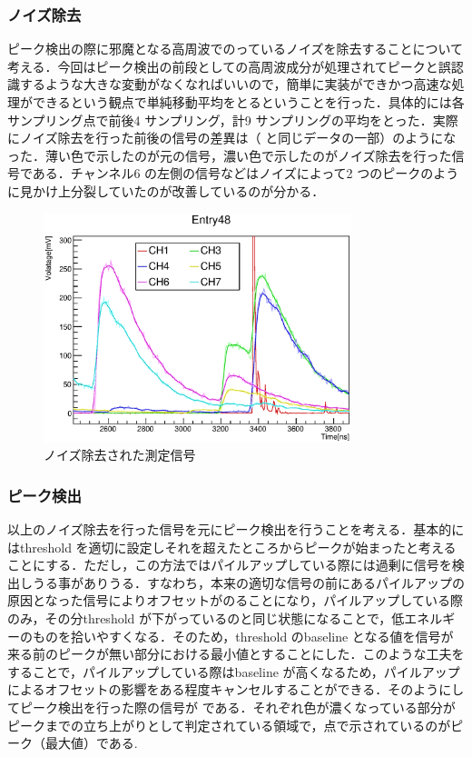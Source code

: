 \subsubsection{ノイズ除去}
ピーク検出の際に邪魔となる高周波でのっているノイズを除去することについて考える．今回はピーク検出の前段としての高周波成分が処理されてピークと誤認識するような大きな変動がなくなればいいので，簡単に実装ができかつ高速な処理ができるという観点で単純移動平均をとるということを行った．具体的には各サンプリング点で前後4 サンプリング，計9 サンプリングの平均をとった．実際にノイズ除去を行った前後の信号の差異は（ と同じデータの一部）のようになった．薄い色で示したのが元の信号，濃い色で示したのがノイズ除去を行った信号である．チャンネル6 の左側の信号などはノイズによって2 つのピークのように見かけ上分裂していたのが改善しているのが分かる．

\begin{figure}[hbt]
\centering
\includegraphics[width=0.8\textwidth]{figure/hatano/smoothdata.eps}
\caption{ノイズ除去された測定信号}
\label{hatano_fig:smoothdata}
\end{figure}

\subsubsection{ピーク検出}
以上のノイズ除去を行った信号を元にピーク検出を行うことを考える．基本的にはthreshold を適切に設定しそれを超えたところからピークが始まったと考えることにする．ただし，この方法ではパイルアップしている際には過剰に信号を検出しうる事がありうる．すなわち，本来の適切な信号の前にあるパイルアップの原因となった信号によりオフセットがのることになり，パイルアップしている際のみ，その分threshold が下がっているのと同じ状態になることで，低エネルギーのものを拾いやすくなる．そのため，threshold のbaseline となる値を信号が来る前のピークが無い部分における最小値とすることにした．このような工夫をすることで，パイルアップしている際はbaseline が高くなるため，パイルアップによるオフセットの影響をある程度キャンセルすることができる．そのようにしてピーク検出を行った際の信号が である．それぞれ色が濃くなっている部分がピークまでの立ち上がりとして判定されている領域で，点で示されているのがピーク（最大値）である.

